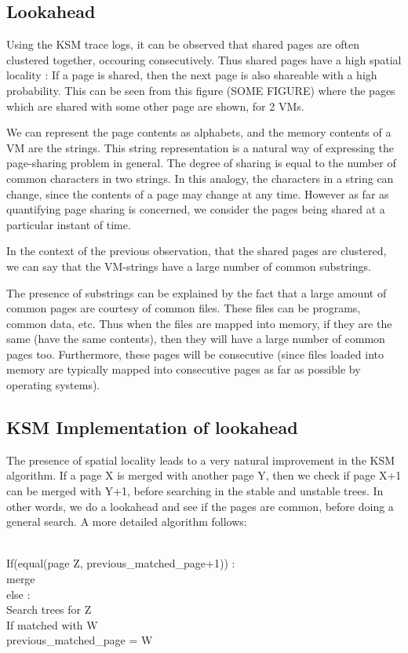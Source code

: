 \documentclass[10pt,a4paper]{article}
\begin{document}
\subsection{Lookahead}
Using the KSM trace logs, it can be observed that shared pages are often clustered together, occouring consecutively. Thus shared pages have a high spatial locality : If a page is shared, then the next page is also shareable with a high probability. 
This can be seen from this figure (SOME FIGURE) where the pages which are shared with some other page are shown, for 2 VMs.

We can represent the page contents as alphabets, and the memory contents of a VM are the strings.
This string representation is a natural way of expressing the page-sharing problem in general. The degree of sharing is equal to the number of common characters in two strings.  In this analogy, the characters in a string can change, since the contents of a page may change at any time. However as far as quantifying page sharing is concerned, we consider the pages being shared at a particular instant of time.

In the context of the previous observation, that the shared pages are clustered, we can say that the VM-strings have a large number of common substrings. 

The presence of substrings can be explained by the fact that a large amount of common pages are courtesy of common files. These files can be programs, common data, etc. Thus when the files are mapped into memory, if they are the same (have the same contents), then they will have a large number of common pages too. Furthermore, these pages will be consecutive (since files loaded into memory are typically mapped into consecutive pages as far as possible by operating systems).

\subsection{KSM Implementation of lookahead}

The presence of spatial locality leads to a very natural improvement in the KSM algorithm. If a page X is merged with another page Y, then we check if page X+1 can be merged with Y+1, before searching in the stable and unstable trees. In other words, we do a lookahead and see if the pages are common, before doing a general search. 
A more detailed algorithm follows:

\\
If(equal(page Z, previous\_matched\_page+1)) : \\
     merge \\
else : \\
   Search trees for Z  \\
   If matched with W  \\
        previous_matched_page = W \\
\end{document}
